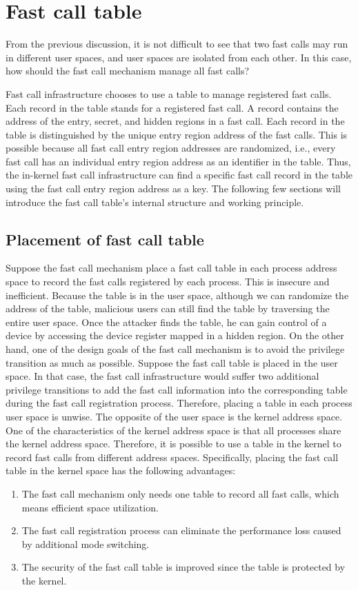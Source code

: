 \section{Fast call table}
From the previous discussion, it is not difficult to see that two fast calls may run in different user spaces, and user spaces are isolated from each other. In this case, how should the fast call mechanism manage all fast calls? 

Fast call infrastructure chooses to use a table to manage registered fast calls. Each record in the table stands for a registered fast call.  
A record contains the address of the entry, secret, and hidden regions in a fast call.
Each record in the table is distinguished by the unique entry region address of the fast calls. 
This is possible because all fast call entry region addresses are randomized, i.e., every fast call 
has an individual entry region address as an identifier in the table. Thus, the in-kernel fast call 
infrastructure can find a specific fast call record in the table using the fast call entry region address as a key. 
The following few sections will introduce the fast call table’s internal structure and working principle.

\subsection{Placement of fast call table}
Suppose the fast call mechanism place a fast call table in each process address space to record 
the fast calls registered by each process. This is insecure and inefficient. Because the table is 
in the user space,  although we can randomize the address of the table, malicious users can still 
find the table by traversing the entire user space. Once the attacker finds the table,  
he can gain control of a device by accessing the device register mapped in a hidden region. 
On the other hand, one of the design goals of the fast call mechanism is to avoid the privilege 
transition as much as possible. Suppose the fast call table is placed in the user space. 
In that case, the fast call infrastructure would suffer two additional privilege transitions to 
add the fast call information into the corresponding table during the fast call registration process. 
Therefore, placing a table in each process user space is unwise.
The opposite of the user space is the kernel address space. One of the characteristics of the kernel address 
space is that all processes share the kernel address space. Therefore, it is possible to use a table in the 
kernel to record fast calls from different address spaces.
Specifically, placing the fast call table in the kernel space has the following advantages:
\begin{enumerate}
  \item The fast call mechanism only needs one table to record all fast calls, which means efficient space utilization.
  \item The fast call registration process can eliminate the performance loss caused by additional mode switching.
  \item The security of the fast call table is improved since the table is protected by the kernel.
\end{enumerate}

